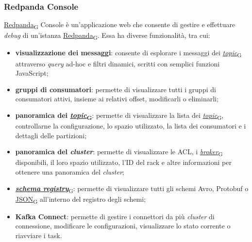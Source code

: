 \subsubsection{Redpanda Console}
\href{https://7last.github.io/docs/pb/documentazione-interna/glossario\#redpanda}{Redpanda\textsubscript{G}} Console è un'applicazione web che consente di gestire e effettuare \textit{debug} di un'istanza \href{https://7last.github.io/docs/pb/documentazione-interna/glossario\#redpanda}{Redpanda\textsubscript{G}}. Essa ha diverse funzionalità, tra cui:
%
\begin{itemize}
	\item \textbf{visualizzazione dei messaggi}: consente di esplorare i messaggi dei \href{https://7last.github.io/docs/pb/documentazione-interna/glossario\#topic}{\textit{topic}\textsubscript{G}} attraverso \textit{query} ad-hoc e filtri dinamici, scritti con semplici funzioni JavaScript;
	\item \textbf{gruppi di consumatori}: permette di visualizzare tutti i gruppi di consumatori attivi, insieme ai relativi offset, modificarli o eliminarli;
	\item \textbf{panoramica dei \href{https://7last.github.io/docs/pb/documentazione-interna/glossario\#topic}{\textit{topic}\textsubscript{G}}}: permette di visualizzare la lista dei \href{https://7last.github.io/docs/pb/documentazione-interna/glossario\#topic}{\textit{topic}\textsubscript{G}}, controllarne la configurazione, lo spazio utilizzato, la lista dei consumatori e i dettagli delle partizioni;
	\item \textbf{panoramica del \textit{cluster}}: permette di visualizzare le ACL, i \href{https://7last.github.io/docs/pb/documentazione-interna/glossario\#broker}{\textit{broker}\textsubscript{G}} disponibili, il loro spazio utilizzato, l'ID del rack e altre informazioni per ottenere una panoramica del \textit{cluster};
	\item \href{https://7last.github.io/docs/pb/documentazione-interna/glossario\#schema-registry}{\textbf{\textit{schema registry}}\textsubscript{G}}: permette di visualizzare tutti gli schemi Avro, Protobuf o \href{https://7last.github.io/docs/pb/documentazione-interna/glossario\#javascript-object-notation}{JSON\textsubscript{G}} all'interno del registro degli schemi;
	\item \textbf{Kafka Connect}: permette di gestire i connettori da più \textit{cluster} di connessione, modificare le configurazioni, visualizzare lo stato corrente o riavviare i task.
\end{itemize}

